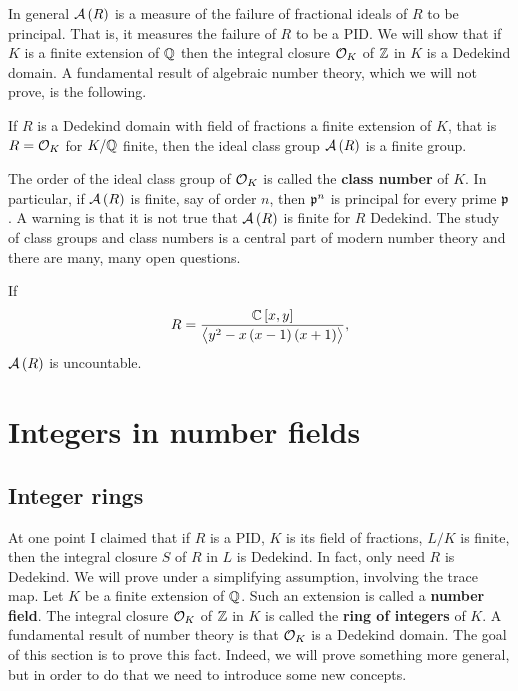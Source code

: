 In general $ \AA\br{R} $ is a measure of the failure of fractional ideals of $ R $ to be principal. That is, it measures the failure of $ R $ to be a PID. We will show that if $ K $ is a finite extension of $ \mathbb{Q} $ then the integral closure $ \mathcal{O}_K $ of $ \mathbb{Z} $ in $ K $ is a Dedekind domain. A fundamental result of algebraic number theory, which we will not prove, is the following.

\begin{theorem}
If $ R $ is a Dedekind domain with field of fractions a finite extension of $ K $, that is $ R = \mathcal{O}_K $ for $ K / \mathbb{Q} $ finite, then the ideal class group $ \AA\br{R} $ is a finite group.
\end{theorem}

The order of the ideal class group of $ \mathcal{O}_K $ is called the \textbf{class number} of $ K $. In particular, if $ \AA\br{R} $ is finite, say of order $ n $, then $ \mathfrak{p}^n $ is principal for every prime $ \mathfrak{p} $. A warning is that it is not true that $ \AA\br{R} $ is finite for $ R $ Dedekind. The study of class groups and class numbers is a central part of modern number theory and there are many, many open questions.

\begin{example*}
If
$$ R = \dfrac{\C\sbr{x, y}}{\abr{y^2 - x\br{x - 1}\br{x + 1}}}, $$
$ \AA\br{R} $ is uncountable.
\end{example*}

\pagebreak

\section{Integers in number fields}

\subsection{Integer rings}

At one point I claimed that if $ R $ is a PID, $ K $ is its field of fractions, $ L / K $ is finite, then the integral closure $ S $ of $ R $ in $ L $ is Dedekind. In fact, only need $ R $ is Dedekind. We will prove under a simplifying assumption, involving the trace map. Let $ K $ be a finite extension of $ \mathbb{Q} $. Such an extension is called a \textbf{number field}. The integral closure $ \mathcal{O}_K $ of $ \mathbb{Z} $ in $ K $ is called the \textbf{ring of integers} of $ K $. A fundamental result of number theory is that $ \mathcal{O}_K $ is a Dedekind domain. The goal of this section is to prove this fact. Indeed, we will prove something more general, but in order to do that we need to introduce some new concepts.

